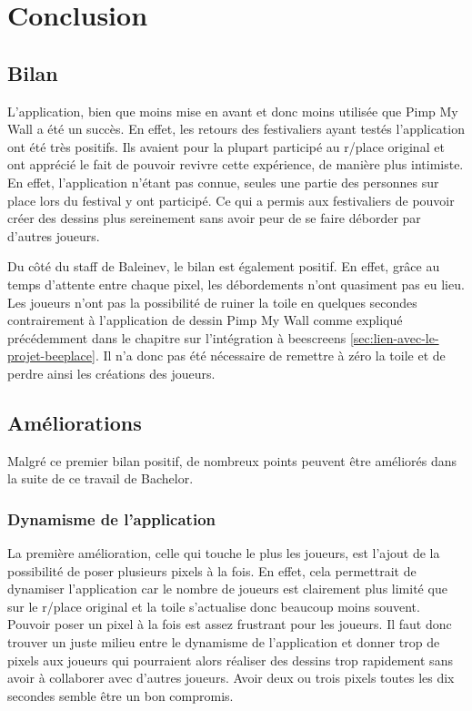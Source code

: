 \section{Conclusion}

\subsection{Bilan}

L'application, bien que moins mise en avant et donc moins utilisée que Pimp My Wall a été un succès. En effet, les retours des festivaliers ayant testés l'application ont été très positifs. Ils avaient pour la plupart participé au r/place original et ont apprécié le fait de pouvoir revivre cette expérience, de manière plus intimiste. En effet, l'application n'étant pas connue, seules une partie des personnes sur place lors du festival y ont participé. Ce qui a permis aux festivaliers de pouvoir créer des dessins plus sereinement sans avoir peur de se faire déborder par d'autres joueurs.

Du côté du staff de Baleinev, le bilan est également positif. En effet, grâce au temps d'attente entre chaque pixel, les débordements n'ont quasiment pas eu lieu. Les joueurs n'ont pas la possibilité de ruiner la toile en quelques secondes contrairement à l'application de dessin Pimp My Wall comme expliqué précédemment dans le chapitre sur l'intégration à \gls{beescreens} \ref{sec:lien-avec-le-projet-beeplace}. Il n'a donc pas été nécessaire de remettre à zéro la toile et de perdre ainsi les créations des joueurs.

\subsection{Améliorations}
\label{poc-ameliorations}

Malgré ce premier bilan positif, de nombreux points peuvent être améliorés dans la suite de ce travail de Bachelor.

\subsubsection{Dynamisme de l'application}
La première amélioration, celle qui touche le plus les joueurs, est l'ajout de la possibilité de poser plusieurs pixels à la fois. En effet, cela permettrait de dynamiser l'application car le nombre de joueurs est clairement plus limité que sur le r/place original et la toile s'actualise donc beaucoup moins souvent. Pouvoir poser un pixel à la fois est assez frustrant pour les joueurs. Il faut donc trouver un juste milieu entre le dynamisme de l'application et donner trop de pixels aux joueurs qui pourraient alors réaliser des dessins trop rapidement sans avoir à collaborer avec d'autres joueurs. Avoir deux ou trois pixels toutes les dix secondes semble être un bon compromis.

